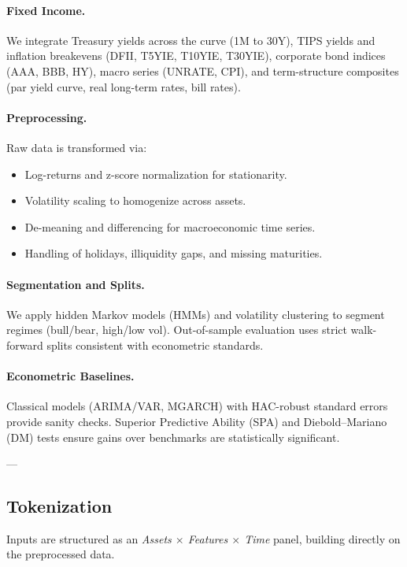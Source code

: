 \documentclass[10pt,twocolumn]{article}
\begin{document}
\paragraph{Fixed Income.}
We integrate Treasury yields across the curve (1M to 30Y), TIPS yields and inflation breakevens (DFII, T5YIE, T10YIE, T30YIE), corporate bond indices (AAA, BBB, HY), macro series (UNRATE, CPI), and term-structure composites (par yield curve, real long-term rates, bill rates).  

\paragraph{Preprocessing.}
Raw data is transformed via: 
\begin{itemize}
    \item Log-returns and z-score normalization for stationarity.
    \item Volatility scaling to homogenize across assets.
    \item De-meaning and differencing for macroeconomic time series.
    \item Handling of holidays, illiquidity gaps, and missing maturities. 
\end{itemize}

\paragraph{Segmentation and Splits.}
We apply hidden Markov models (HMMs) and volatility clustering to segment regimes (bull/bear, high/low vol). Out-of-sample evaluation uses strict walk-forward splits consistent with econometric standards.  

\paragraph{Econometric Baselines.}
Classical models (ARIMA/VAR, MGARCH) with HAC-robust standard errors provide sanity checks. Superior Predictive Ability (SPA) and Diebold--Mariano (DM) tests ensure gains over benchmarks are statistically significant.  

---

\subsection{Tokenization}

Inputs are structured as an \textit{Assets $\times$ Features $\times$ Time} panel, building directly on the preprocessed data.  
\end{document}
